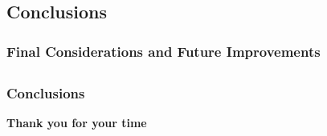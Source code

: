 \subsection{Conclusions}

\begin{frame}
    \frametitle{Final Considerations and Future Improvements}

    
\end{frame}

\subsection{}

\begin{frame}
    \frametitle{Conclusions}

    \vspace*{\fill}
    \begin{center}
        \Huge{\textbf{Thank you for your time}}
    \end{center}
    \vspace*{\fill}
    
\end{frame}